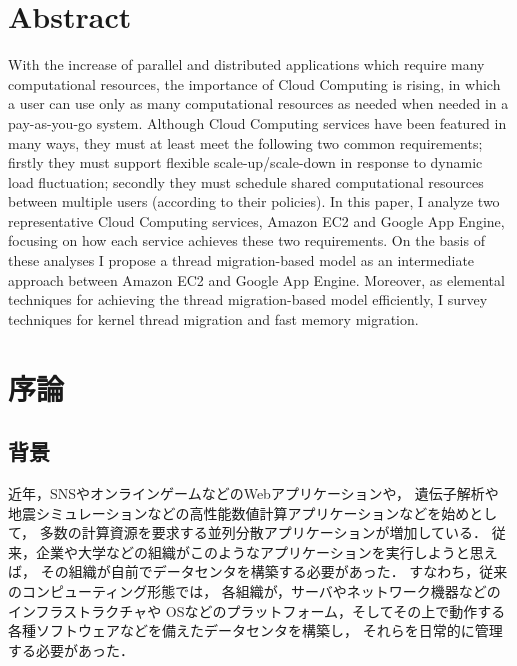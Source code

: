 \documentclass[10pt]{jsarticle}
\begin{document}

\maketitle

\section*{Abstract}

With the increase of parallel and distributed applications 
which require many computational resources, the importance of Cloud Computing is rising, 
in which a user can use only as many computational resources as needed when needed 
in a pay-as-you-go system. 
Although Cloud Computing services have been featured in many ways, 
they must at least meet the following two common requirements; 
firstly they must support flexible scale-up/scale-down in response to dynamic load fluctuation; 
secondly they must schedule shared computational resources between multiple users 
(according to their policies). 
In this paper, I analyze two representative Cloud Computing services, 
Amazon EC2 and Google App Engine, focusing on how each service achieves these two requirements. 
On the basis of these analyses I propose a thread migration-based model 
as an intermediate approach between Amazon EC2 and Google App Engine. 
Moreover, as elemental techniques for achieving the thread migration-based model efficiently, 
I survey techniques for kernel thread migration and fast memory migration. 

\section{序論}
\label{sec:intro}

\subsection{背景}

近年，SNSやオンラインゲームなどのWebアプリケーションや，
遺伝子解析や地震シミュレーションなどの高性能数値計算アプリケーションなどを始めとして，
多数の計算資源を要求する並列分散アプリケーションが増加している．
従来，企業や大学などの組織がこのようなアプリケーションを実行しようと思えば，
その組織が自前でデータセンタを構築する必要があった．
すなわち，従来のコンピューティング形態では，
各組織が，サーバやネットワーク機器などのインフラストラクチャや
OSなどのプラットフォーム，そしてその上で動作する各種ソフトウェアなどを備えたデータセンタを構築し，
それらを日常的に管理する必要があった．
\end{document}

